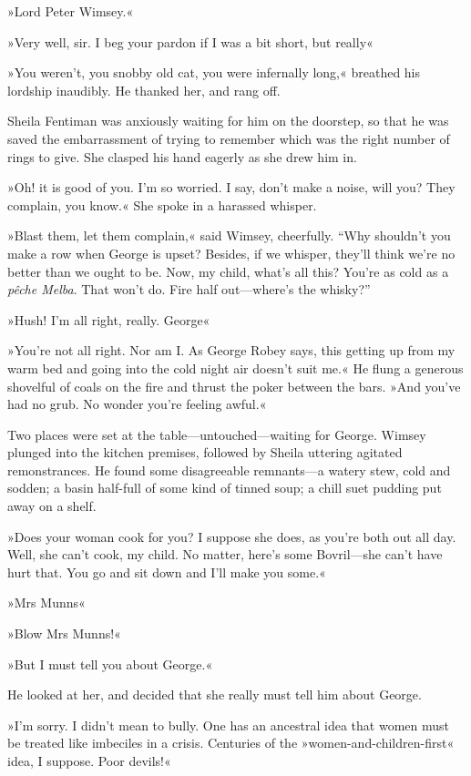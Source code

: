 »Lord Peter Wimsey.«

»Very well, sir. I beg your pardon if I was a bit short, but really\longdash«

»You weren't, you snobby old cat, you were infernally long,« breathed his lordship inaudibly. He thanked her, and rang off.

Sheila Fentiman was anxiously waiting for him on the doorstep, so that he was saved the embarrassment of trying to remember which was the right number of rings to give. She clasped his hand eagerly as she drew him in.

»Oh! it is good of you. I'm so worried. I say, don't make a noise, will you? They complain, you know.« She spoke in a harassed whisper.

»Blast them, let them complain,« said Wimsey, cheerfully. \enquote{Why shouldn't you make a row when George is upset? Besides, if we whisper, they'll think we're no better than we ought to be. Now, my child, what's all this? You're as cold as a \textit{pêche Melba}. That won't do. Fire half out\allowbreak---\allowbreak where's the whisky?}

»Hush! I'm all right, really. George\longdash«

»You're not all right. Nor am I. As George Robey says, this getting up from my warm bed and going into the cold night air doesn't suit me.« He flung a generous shovelful of coals on the fire and thrust the poker between the bars. »And you've had no grub. No wonder you're feeling awful.«

Two places were set at the table\allowbreak---\allowbreak untouched---waiting for George. Wimsey plunged into the kitchen premises, followed by Sheila uttering agitated remonstrances. He found some disagreeable remnants\allowbreak---\allowbreak a watery stew, cold and sodden; a basin half-full of some kind of tinned soup; a chill suet pudding put away on a shelf.

»Does your woman cook for you? I suppose she does, as you're both out all day. Well, she can't cook, my child. No matter, here's some Bovril\allowbreak---\allowbreak she can't have hurt that. You go and sit down and I'll make you some.«

»Mrs Munns\longdash«

»Blow Mrs Munns!«

»But I must tell you about George.«

He looked at her, and decided that she really must tell him about George.

»I'm sorry. I didn't mean to bully. One has an ancestral idea that women must be treated like imbeciles in a crisis. Centuries of the »women-and-children-first« idea, I suppose. Poor devils!«

